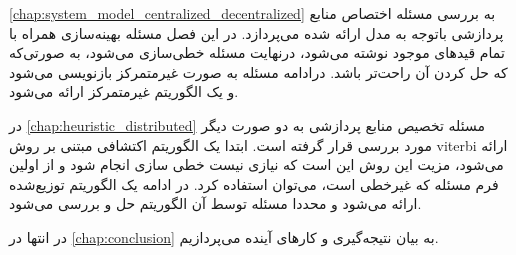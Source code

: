     \cref{chap:system_model_centralized_decentralized} به بررسی مسئله اختصاص منابع پردازشی باتوجه به مدل ارائه شده می‌پردازد.
    در این فصل مسئله بهینه‌سازی همراه با تمام قیدهای موجود نوشته می‌شود، درنهایت مسئله خطی‌سازی می‌شود، به صورتی‌که که حل کردن آن راحت‌تر باشد. 
    درادامه مسئله به صورت غیرمتمرکز بازنویسی می‌شود و یک الگوریتم غیرمتمرکز ارائه می‌شود. 

    در \cref{chap:heuristic_distributed} مسئله تخصیص منابع پردازشی به دو صورت دیگر مورد بررسی قرار گرفته است.
    ابتدا یک الگوریتم اکتشافی مبتنی بر روش viterbi ارائه می‌شود، مزیت این روش این است که نیازی نیست خطی سازی انجام شود و از اولین فرم مسئله که غیرخطی است، می‌توان استفاده کرد. 
    در ادامه یک الگوریتم توزیع‌شده ارائه می‌شود و محددا مسئله توسط آن الگوریتم حل و بررسی می‌شود. 

    در انتها در \cref{chap:conclusion} به بیان نتیجه‌گیری و کار‌های آینده می‌پردازیم.